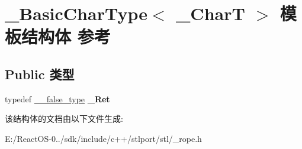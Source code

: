 \hypertarget{struct___basic_char_type}{}\section{\+\_\+\+Basic\+Char\+Type$<$ \+\_\+\+CharT $>$ 模板结构体 参考}
\label{struct___basic_char_type}
\subsection*{Public 类型}
\begin{DoxyCompactItemize}
\item 
\mbox{\label{struct___basic_char_type_a1d31163df84c2c41dd2ec91b642dafc5}} 
typedef \hyperlink{struct____false__type}{\+\_\+\+\_\+false\+\_\+type} {\bfseries \+\_\+\+Ret}
\end{DoxyCompactItemize}


该结构体的文档由以下文件生成\+:\begin{DoxyCompactItemize}
\item 
E\+:/\+React\+O\+S-\/0../sdk/include/c++/stlport/stl/\+\_\+rope.\+h\end{DoxyCompactItemize}
